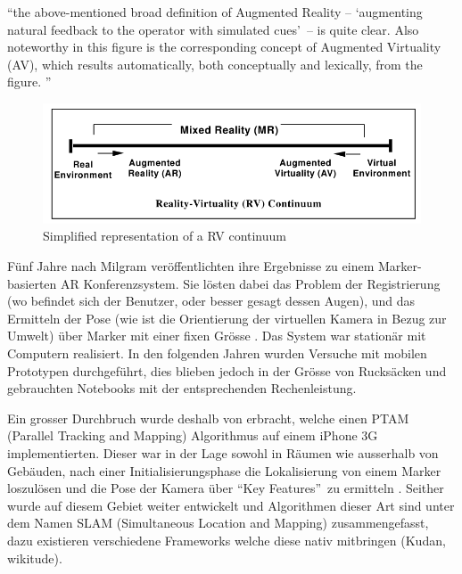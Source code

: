 \documentclass[a4paper]{scrreprt}
\begin{document}
\vspace{1em}

\textquotedblleft the above-mentioned broad definition of Augmented Reality –  \textquoteleft augmenting natural feedback to the operator with simulated cues\textquoteright\ – is quite clear. Also noteworthy in this figure is the corresponding concept of Augmented Virtuality (AV), which results automatically, both conceptually and lexically, from the figure. \textquotedblright\ \parencite{Milgram1994}

\begin{figure}[htb]
	\includegraphics[keepaspectratio, width=\textwidth]{MR_milgram.png}
	\caption{Simplified representation of a RV continuum \parencite{Milgram1994}}
	\label{fig:RVContiinum}
\end{figure}

Fünf Jahre nach Milgram veröffentlichten \citeauthor{Kato1999} ihre Ergebnisse zu einem Marker-basierten AR Konferenzsystem. Sie lösten dabei das Problem der Registrierung (wo befindet sich der Benutzer, oder besser gesagt dessen Augen), und das Ermitteln der Pose (wie ist die Orientierung der virtuellen Kamera in Bezug zur Umwelt) über Marker mit einer fixen Grösse \parencite{Kato1999}. Das System war stationär mit Computern realisiert. In den folgenden Jahren wurden Versuche mit  mobilen Prototypen durchgeführt, dies blieben jedoch in der Grösse von Rucksäcken und gebrauchten Notebooks mit der entsprechenden Rechenleistung.

Ein grosser Durchbruch wurde deshalb von \citeauthor{Klein2009} erbracht, welche einen PTAM (Parallel Tracking and Mapping) Algorithmus auf einem iPhone 3G implementierten. Dieser war in der Lage sowohl in Räumen wie ausserhalb von Gebäuden, nach einer Initialisierungsphase die Lokalisierung von einem Marker loszulösen und die Pose der Kamera über \textquotedblleft Key Features\textquotedblright\ zu ermitteln \parencite{Klein2009}. Seither wurde auf diesem Gebiet weiter entwickelt und Algorithmen dieser Art sind unter dem Namen SLAM (Simultaneous Location and Mapping) zusammengefasst, dazu existieren verschiedene Frameworks welche diese nativ mitbringen (Kudan, wikitude).
\end{document}
